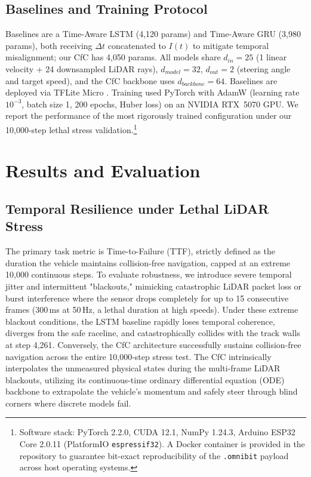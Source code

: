 \documentclass[conference]{IEEEtran}
\begin{document}
\subsection{Baselines and Training Protocol}
Baselines are a Time-Aware LSTM (4{,}120 params) and Time-Aware GRU (3{,}980 params), both receiving $\Delta t$ concatenated to $I(t)$ to mitigate temporal misalignment; our CfC has 4{,}050 params. All models share $d_{in}=25$ (1 linear velocity + 24 downsampled LiDAR rays), $d_{model}=32$, $d_{out}=2$ (steering angle and target speed), and the CfC backbone uses $d_{backbone}=64$. Baselines are deployed via TFLite Micro \cite{david2021tflitemicro}. Training used PyTorch with AdamW \cite{kingma2014adam,loshchilov2019adamw} (learning rate $10^{-3}$, batch size 1, 200 epochs, Huber loss) on an NVIDIA RTX~5070 GPU. We report the performance of the most rigorously trained configuration under our 10,000-step lethal stress validation.\footnote{Software stack: PyTorch 2.2.0, CUDA 12.1, NumPy 1.24.3, Arduino ESP32 Core 2.0.11 (PlatformIO \texttt{espressif32}). A Docker container is provided in the repository to guarantee bit-exact reproducibility of the \texttt{.omnibit} payload across host operating systems.}

\section{Results and Evaluation}
\subsection{Temporal Resilience under Lethal LiDAR Stress}
The primary task metric is Time-to-Failure (TTF), strictly defined as the duration the vehicle maintains collision-free navigation, capped at an extreme 10,000 continuous steps. To evaluate robustness, we introduce severe temporal jitter and intermittent "blackouts," mimicking catastrophic LiDAR packet loss or burst interference where the sensor drops completely for up to 15 consecutive frames (300\,ms at 50\,Hz, a lethal duration at high speeds). Under these extreme blackout conditions, the LSTM baseline rapidly loses temporal coherence, diverges from the safe raceline, and catastrophically collides with the track walls at step 4,261. Conversely, the CfC architecture successfully sustains collision-free navigation across the entire 10,000-step stress test. The CfC intrinsically interpolates the unmeasured physical states during the multi-frame LiDAR blackouts, utilizing its continuous-time ordinary differential equation (ODE) backbone to extrapolate the vehicle's momentum and safely steer through blind corners where discrete models fail.
\end{document}
